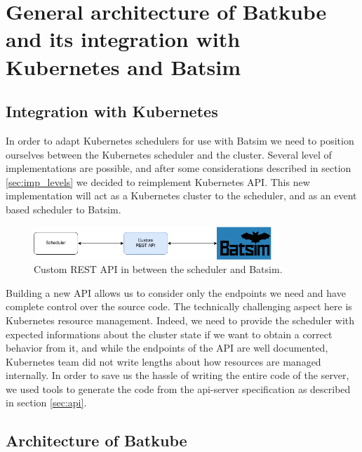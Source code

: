 \section{General architecture of Batkube and its integration with Kubernetes and Batsim}

\subsection{Integration with Kubernetes}

In order to adapt Kubernetes schedulers for use with Batsim we need to position
ourselves between the Kubernetes scheduler and the cluster. Several level of
implementations are possible, and after some considerations described in
section \ref{sec:imp_levels} we decided to reimplement Kubernetes API. This new
implementation will act as a Kubernetes cluster to the scheduler, and as an
event based scheduler to Batsim.

\begin{figure}[h]
	\centering
	\includegraphics[width=0.8\textwidth]{imgs/custom-restapi.png}
	\caption{Custom REST API in between the scheduler and Batsim.}
	\label{fig:custom-api}
\end{figure}

Building a new API allows us to consider only the endpoints we need and have
complete control over the source code. The technically challenging aspect here
is Kubernetes resource management. Indeed, we need to provide the scheduler
with expected informations about the cluster state if we want to obtain a
correct behavior from it, and while the endpoints of the API are well
documented, Kubernetes team did not write lengths about how resources are
managed internally. In order to save us the hassle of writing the entire code
of the server, we used tools to generate the code from the api-server
specification as described in section \ref{sec:api}.

\subsection{Architecture of Batkube}

